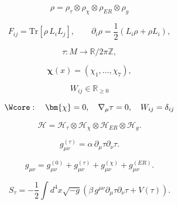 \[
\rho = \rho_\tau \otimes \rho_\chi \otimes \rho_{ER} \otimes \rho_g
\]

\[
F_{ij} = \mathrm{Tr}\left[\rho\, L_i L_j\right], \qquad \partial_i \rho = \frac{1}{2}\left(L_i\rho + \rho L_i\right),
\]

\[
\tau : M \to \mathbb{R}/2\pi\mathbb{Z},
\]

\[
\bm{\chi}(x) = (\chi_1, \dots, \chi_7),
\]

\[
W_{ij} \in \mathbb{R}_{\ge 0}
\]

\[
\Wcore: \quad
\bm{\chi}=0,\quad \nabla_\mu \tau =0,\quad W_{ij}=\delta_{ij}
\]

\[
\mathcal{H} = \mathcal{H}_\tau \otimes \mathcal{H}_\chi \otimes \mathcal{H}_{ER} \otimes \mathcal{H}_g.
\]

\[
g^{(\tau)}_{\mu\nu}
=
\alpha\, \partial_\mu \tau \partial_\nu \tau.
\]

\[
g_{\mu\nu} 
= 
g^{(0)}_{\mu\nu}
+ g^{(\tau)}_{\mu\nu}
+ g^{(\chi)}_{\mu\nu}
+ g^{(ER)}_{\mu\nu}.
\]

\[
S_\tau
=
-\frac{1}{2}\int d^4x \sqrt{-g}\left(
\beta\, g^{\mu\nu}\partial_\mu\tau\partial_\nu\tau
+ V(\tau)
\right).
\]

